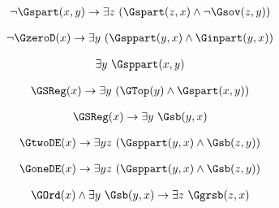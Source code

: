 \begin{erin}
    \begin{align*}
        \neg\Gspart(x,y) \to \exists z\ (\Gspart(z,x) \wedge \neg\Gsov(z,y))
    \end{align*}
\end{erin}

\begin{erin}
    \begin{align*}
        \neg\GzeroD(x) \to \exists y\ (\Gsppart(y,x) \wedge \Ginpart(y,x))
    \end{align*}
\end{erin}
        
\begin{erin}
    \begin{align*}
        \exists y\ \Gsppart(x,y)
    \end{align*}
\end{erin}

\begin{erin}
    \begin{align*}
        \GSReg(x) \to \exists y\ (\GTop(y) \wedge \Gspart(x,y))
    \end{align*}
\end{erin}

\begin{erin}
    \begin{align*}
        \GSReg(x) \to \exists y\ \Gsb(y,x)
    \end{align*}
\end{erin}

\begin{erin}
    \begin{align*}
        \GtwoDE(x) \to \exists y z\ (\Gsppart(y,x) \wedge \Gsb(z,y))
    \end{align*}
\end{erin}

\begin{erin}
    \begin{align*}
        \GoneDE(x) \to \exists y z\ ( \Gsppart(y,x) \wedge \Gsb(z,y))
    \end{align*}
\end{erin}

\begin{erin}
    \begin{align*}
        \GOrd(x) \wedge \exists y\ \Gsb(y,x) \to \exists z\ \Ggrsb(z,x)
    \end{align*}
\end{erin}

